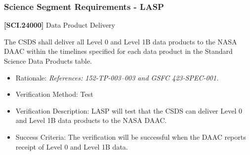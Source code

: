 \subsubsection{Science Segment Requirements - LASP}
\label{sciencesegmentrequirements-lasp}

\textbf{[SCI.24000]} Data Product Delivery

The \gls{CSDS} shall deliver all Level 0 and Level 1B data products to the NASA \gls{DAAC} within the timelines specified for each data product in the Standard Science Data Products table.

\begin{itemize}
\item{} Rationale: \emph{References: 152-TP-003--003 and GSFC 423-SPEC-001.}

\item{} Verification Method: Test

\item{} Verification Description: \gls{LASP} will \gls{test} that the \gls{CSDS} can deliver Level 0 and Level 1B data products to the NASA \gls{DAAC}.

\item{} Success Criteria: The verification will be successful when the \gls{DAAC} reports receipt of Level 0 and Level 1B data.

\end{itemize}



